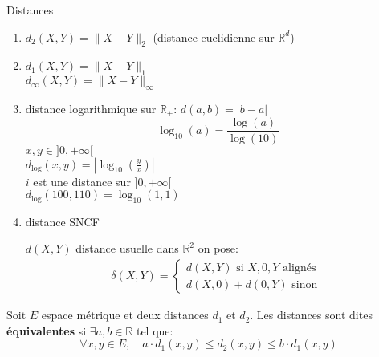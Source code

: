 \documentclass[a4paper]{report}
\newcommand\R{\ensuremath{\mathbb{R}}}
\theoremstyle{definition}
\begin{document}
\begin{eg} Distances
   \begin{enumerate}
       \item $d_2(X, Y) = \|X - Y\|_2$ (distance euclidienne sur $\R^d$)
       \item $d_1(X, Y) = \|X - Y\|_1$\\
           $d_{\infty}(X, Y) = \|X - Y\|_{\infty}$
       \item distance logarithmique sur $\R_+$:  $d(a, b) = |b - a|$
           \[
               \log_{10}(a) = \frac{\log(a)}{\log(10)}
           \] 
           $x, y \in ]0, +\infty[$\\ 
           $d_{\log}(x, y) = |\log_{10}(\frac{y}{x})|$ \\
           $i$ est une distance sur  $]0, +\infty[$\\
           $d_{\log}(100, 110) = \log_{10}(1,1)$
       \item distance SNCF
           \begin{center}
               
           \end{center}
           $d(X, Y)$ distance usuelle dans  $\R^2$
           on pose:
            \begin{align*}
               \delta(X, Y) = \begin{cases}
                   d(X, Y) \text{ si } X, 0, Y \text{ alignés}\\
                   d(X, 0) + d(0, Y) \text{ sinon }
               \end{cases}
           \end{align*}
   \end{enumerate}
\end{eg}
\begin{prop}
    Soit $E$ espace métrique et deux distances $d_1$ et $d_2$. Les distances sont dites \textbf{équivalentes} si $\exists a, b \in \R$ tel que:
    \[
    \forall x, y \in E, \quad a\cdot d_1(x, y) \le d_2(x, y) \le b\cdot  d_1(x, y)
    \] 
\end{prop}
\end{document}
